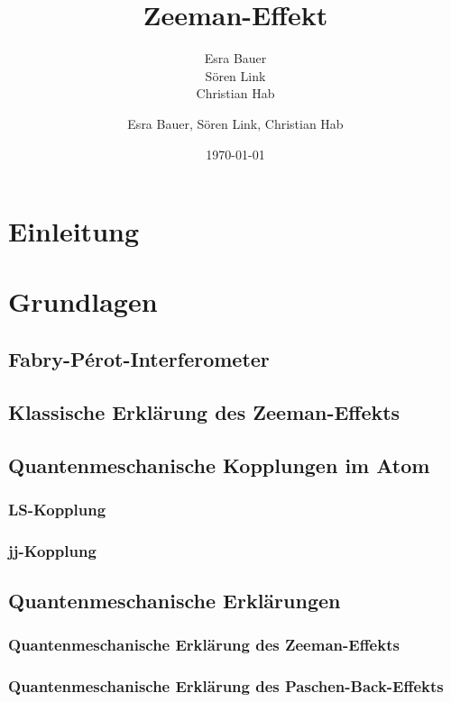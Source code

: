 \documentclass[bigchapter,colorback,accentcolor=tud4b,linedtoc,11pt]{tudreport}
\title{Zeeman-Effekt}
\subtitle{Esra Bauer  \\Sören Link \\Christian Hab}
\author{Esra Bauer, Sören Link, Christian Hab}
\date{\today}
\begin{document}

\maketitle

\tableofcontents


\chapter{Einleitung}

\chapter{Grundlagen}
\section{Fabry-Pérot-Interferometer}


\section{Klassische Erklärung des Zeeman-Effekts}
\section{Quantenmeschanische Kopplungen im Atom}
\subsection{LS-Kopplung}
\subsection{jj-Kopplung}
\section{Quantenmeschanische Erklärungen}
\subsection{Quantenmeschanische Erklärung des Zeeman-Effekts}
\subsection{Quantenmeschanische Erklärung des Paschen-Back-Effekts}
\end{document}
